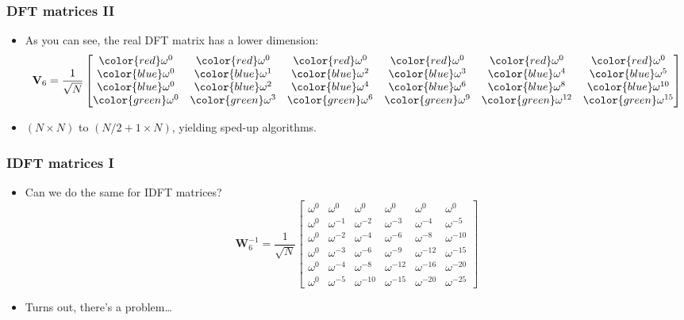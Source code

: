 \documentclass{beamer}
\begin{document}
\begin{frame}
\frametitle{DFT matrices II}
\begin{itemize}
    \item As you can see, the real DFT matrix has a lower dimension:
    \begin{equation}
        \mathbf{V}_6 = \frac{1}{\sqrt{N}}\begin{bmatrix}
            {\color{red}\omega^0} & {\color{red}\omega^0} & {\color{red}\omega^0} & {\color{red}\omega^0} & {\color{red}\omega^0} & {\color{red}\omega^0}\\
            {\color{blue}\omega^0} & {\color{blue}\omega^1} & {\color{blue}\omega^2} & {\color{blue}\omega^3} & {\color{blue}\omega^4} & {\color{blue}\omega^5}\\
            {\color{blue}\omega^0} & {\color{blue}\omega^2} & {\color{blue}\omega^4} & {\color{blue}\omega^6} & {\color{blue}\omega^8} & {\color{blue}\omega^{10}}\\
            {\color{green}\omega^0} & {\color{green}\omega^3} & {\color{green}\omega^6} & {\color{green}\omega^9} &  {\color{green} \omega^{12}} & {\color{green} \omega^{15}}\\
        \end{bmatrix}
    \end{equation}
    \item $(N \times N)$ to $(N / 2 + 1 \times N)$, yielding sped-up algorithms.
\end{itemize}
\end{frame}

\begin{frame}
\frametitle{IDFT matrices I}
\begin{itemize}
    \item Can we do the same for IDFT matrices?
    \begin{equation}
        \mathbf{W}^{-1}_6 = \frac{1}{\sqrt{N}}\begin{bmatrix}
            \omega^0 & \omega^0 & \omega^0 & \omega^0 & \omega^0 & \omega^0\\
            \omega^0 & \omega^{-1} & \omega^{-2} & \omega^{-3} & \omega^{-4} & \omega^{-5}\\
            \omega^0 & \omega^{-2} & \omega^{-4} & \omega^{-6} & \omega^{-8} & \omega^{-10}\\
            \omega^0 & \omega^{-3} & \omega^{-6} & \omega^{-9} & \omega^{-12} & \omega^{-15}\\
            \omega^0 & \omega^{-4} & \omega^{-8} & \omega^{-12} & \omega^{-16} & \omega^{-20}\\
            \omega^0 & \omega^{-5} & \omega^{-10} & \omega^{-15} & \omega^{-20} & \omega^{-25}
        \end{bmatrix}
    \end{equation}
    \item Turns out, there's a problem…
\end{itemize}
\end{frame}
\end{document}
